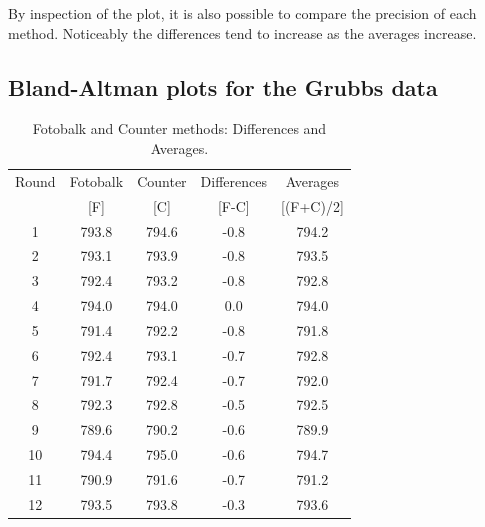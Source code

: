 \documentclass[12pt, a4paper]{report}
\theoremstyle{plain}
\theoremstyle{definition}
\theoremstyle{remark}
\begin{document}
	

By inspection of the plot, it is also possible to compare the precision of each method. Noticeably the differences tend to increase as the averages increase.
		

	
\subsection{Bland-Altman plots for the Grubbs data}

	


	
	
	\begin{table}[h!]
		\renewcommand\arraystretch{0.7}%
		\begin{center}
			\begin{tabular}{|c||c|c||c|c|}
				\hline
				Round & Fotobalk  & Counter  & Differences  & Averages  \\
				&  [F] & [C] & [F-C] &  [(F+C)/2] \\
				\hline
				1 & 793.8 & 794.6 & -0.8 & 794.2 \\
				2 & 793.1 & 793.9 & -0.8 & 793.5 \\
				3 & 792.4 & 793.2 & -0.8 & 792.8 \\
				4 & 794.0 & 794.0 & 0.0 & 794.0 \\
				5 & 791.4 & 792.2 & -0.8 & 791.8 \\
				6 & 792.4 & 793.1 & -0.7 & 792.8 \\
				7 & 791.7 & 792.4 & -0.7 & 792.0 \\
				8 & 792.3 & 792.8 & -0.5 & 792.5 \\
				9 & 789.6 & 790.2 & -0.6 & 789.9 \\
				10 & 794.4 & 795.0 & -0.6 & 794.7 \\
				11 & 790.9 & 791.6 & -0.7 & 791.2 \\
				12 & 793.5 & 793.8 & -0.3 & 793.6 \\
				\hline
			\end{tabular}
			\caption{Fotobalk and Counter methods: Differences and Averages.}
		\label{GrubbsData1}
		\end{center}
	\end{table}
	
\end{document}
